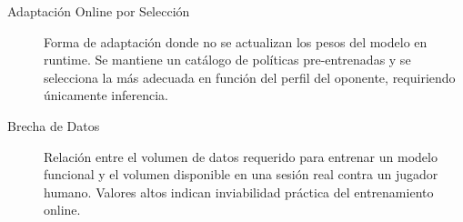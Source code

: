 \begin{description}
\item[Adaptación Online por Selección] Forma de adaptación donde no se actualizan los pesos del modelo en runtime. Se mantiene un catálogo de políticas pre-entrenadas y se selecciona la más adecuada en función del perfil del oponente, requiriendo únicamente inferencia.

\item[Brecha de Datos] Relación entre el volumen de datos requerido para entrenar un modelo funcional y el volumen disponible en una sesión real contra un jugador humano. Valores altos indican inviabilidad práctica del entrenamiento online.
\end{description}
\vfill